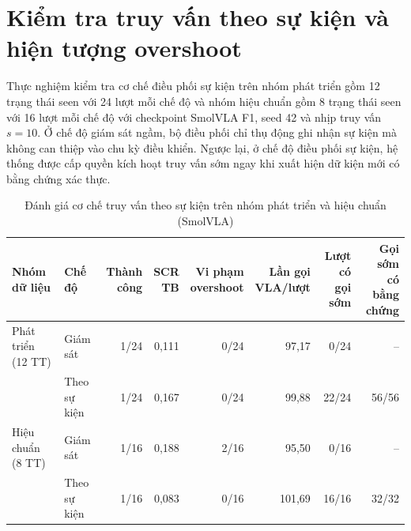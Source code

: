 \section{Kiểm tra truy vấn theo sự kiện và hiện tượng overshoot}
\label{sec:d2-evidence}
\label{sec:d2-calibration}

Thực nghiệm kiểm tra cơ chế điều phối sự kiện trên nhóm phát triển gồm 12 trạng thái seen với 24 lượt mỗi chế độ và nhóm hiệu chuẩn gồm 8 trạng thái seen với 16 lượt mỗi chế độ với checkpoint SmolVLA F1, seed 42 và nhịp truy vấn $s = 10$. Ở chế độ giám sát ngầm, bộ điều phối chỉ thụ động ghi nhận sự kiện mà không can thiệp vào chu kỳ điều khiển. Ngược lại, ở chế độ điều phối sự kiện, hệ thống được cấp quyền kích hoạt truy vấn sớm ngay khi xuất hiện dữ kiện mới có bằng chứng xác thực.

\begin{table}[htbp]
\centering\footnotesize
\caption{Đánh giá cơ chế truy vấn theo sự kiện trên nhóm phát triển và hiệu chuẩn (SmolVLA)}
\label{tab:d2-combined}
\label{tab:d2-decision-results}
\label{tab:d2-calibration-results}
\setlength{\tabcolsep}{2.5pt}
\begin{tabular}{l|l|r|r|r|r|r|r}
\toprule
\textbf{Nhóm dữ liệu} & \textbf{Chế độ} & \shortstack{\textbf{Thành}\\\textbf{công}} & \shortstack{\textbf{SCR}\\\textbf{TB}} & \shortstack{\textbf{Vi phạm}\\\textbf{overshoot}} & \shortstack{\textbf{Lần gọi}\\\textbf{VLA/lượt}} & \shortstack{\textbf{Lượt có}\\\textbf{gọi sớm}} & \shortstack{\textbf{Gọi sớm có}\\\textbf{bằng chứng}} \\
\midrule
Phát triển (12 TT) & Giám sát & 1/24 & 0,111 & 0/24 & 97,17 & 0/24 & -- \\
                   & Theo sự kiện & 1/24 & 0,167 & 0/24 & 99,88 & 22/24 & 56/56 \\
\midrule
Hiệu chuẩn (8 TT)  & Giám sát & 1/16 & 0,188 & 2/16 & 95,50 & 0/16 & -- \\
                   & Theo sự kiện & 1/16 & 0,083 & 0/16 & 101,69 & 16/16 & 32/32 \\
\bottomrule
\end{tabular}
\end{table}

